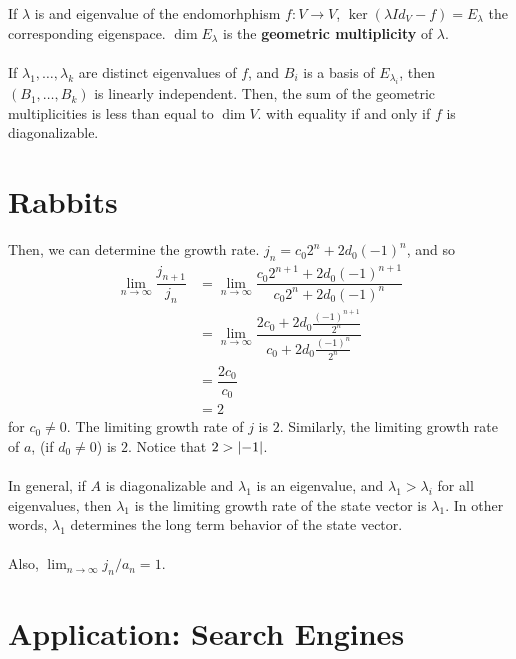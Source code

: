 \documentclass[letterpaper,12pt]{article}
\begin{document}
If $\lambda$ is and eigenvalue of the endomorhphism $f: V \rightarrow V$, $\ker{(\lambda Id_{V} - f)} = E_{\lambda}$ the corresponding eigenspace. $\dim{E_{\lambda}}$ is the \textbf{geometric multiplicity} of $\lambda$.
\\ \\ If $\lambda_1, \dots, \lambda_k$ are distinct eigenvalues of $f$, and $B_i$ is a basis of $E_{\lambda_i}$, then $(B_1, \dots, B_k)$ is linearly independent. Then, the sum of the geometric multiplicities is less than equal to $\dim{V}$. with equality if and only if $f$ is diagonalizable.

\section*{Rabbits}
Then, we can determine the growth rate. $j_n = c_0 2^n + 2 d_0 (-1)^n$, and so
\begin{align*}
    \lim_{n \to \infty} \dfrac{j_{n+1}}{j_n} & = \lim_{n \to \infty} \dfrac{c_0 2^{n+1} + 2 d_0 (-1)^{n+1}}{c_0 2^n + 2 d_0 (-1)^n} \\
    & = \lim_{n \to \infty} \dfrac{2c_0 + 2 d_0 \frac{(-1)^{n+1}}{2^n}}{c_0 + 2 d_0 \frac{(-1)^n}{2^n}} \\
    & = \dfrac{2c_0}{c_0} \\
    & = 2
\end{align*}
for $c_0 \neq 0$. The limiting growth rate of $j$ is $2$. Similarly, the limiting growth rate of $a$, (if $d_0 \neq 0$) is $2$. Notice that $2 > \left\lvert -1 \right\rvert$.
\\ \\ In general, if $A$ is diagonalizable and $\lambda_1$ is an eigenvalue, and  $\lambda_1 > \lambda_i$ for all eigenvalues, then $\lambda_1$ is the limiting growth rate of the state vector is $\lambda_1$. In other words, $\lambda_1$ determines the long term behavior of the state vector.
\\ \\ Also, $\lim_{n \to \infty} j_n / a_n = 1$.

\section*{Application: Search Engines}
\end{document}
